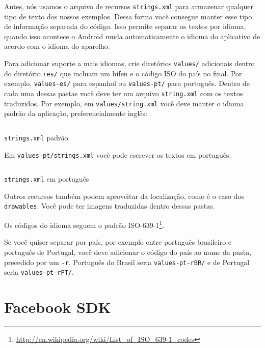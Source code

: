 \documentclass[a4paper,12pt,brazil,oneside]{book}
\begin{document}
	Antes, nós usamos o arquivo de recursos \texttt{strings.xml} para armazenar qualquer tipo de texto dos nossos exemplos. Dessa forma você consegue manter esse tipo de informação separada do código. Isso permite separar os textos por idioma, quando isso acontece o Android muda automaticamente o idioma do aplicativo de acordo com o idioma do aparelho.
	
	Para adicionar suporte a mais idiomas, crie diretórios \texttt{values/} adicionais dentro do diretório \texttt{res/} que incluam um hífen e o código ISO do país no final. Por exemplo, \texttt{values-es/} para espanhol ou \texttt{values-pt/} para português. Dentro de cada uma dessas pastas você deve ter um arquivo \texttt{string.xml} com os textos traduzidos. Por exemplo, em \texttt{values/string.xml} você deve manter o idioma padrão da aplicação, preferencialmente inglês:

	\begin{listing}[H]
	\inputminted[linenos=true,fontsize=\small,frame=lines, framesep=2mm, tabsize=2,numbersep=5pt]{xml}{src/api/locale/string-en.xml}
	\caption{\texttt{strings.xml} padrão}
	\label{code:locale-strings}
	\end{listing} 	

	Em \texttt{values-pt/strings.xml} você pode escrever os textos em português:

	\begin{listing}[H]
	\inputminted[linenos=true,fontsize=\small,frame=lines, framesep=2mm, tabsize=2,numbersep=5pt]{xml}{src/api/locale/string-pt.xml}
	\caption{\texttt{strings.xml} em português}
	\label{code:locale-strings-pt}
	\end{listing} 	

	Outros recursos também podem aproveitar da localização, como é o caso dos \texttt{drawables}. Você pode ter imagens traduzidas dentro dessas pastas.

	Os códigos do idioma seguem o padrão ISO-639-1\footnote{\href{http://en.wikipedia.org/wiki/List\_of\_ISO\_639-1\_codes}{http://en.wikipedia.org/wiki/List\_of\_ISO\_639-1\_codes}}.

	Se você quiser separar por país, por exemplo entre português brasileiro e português de Portugal, você deve adicionar o código do país ao nome da pasta, precedido por um \texttt{-r}. Português do Brasil seria \texttt{values-pt-rBR/} e de Portugal seria \texttt{values-pt-rPT/}.


\chapter{Facebook SDK}
	
\end{document}
